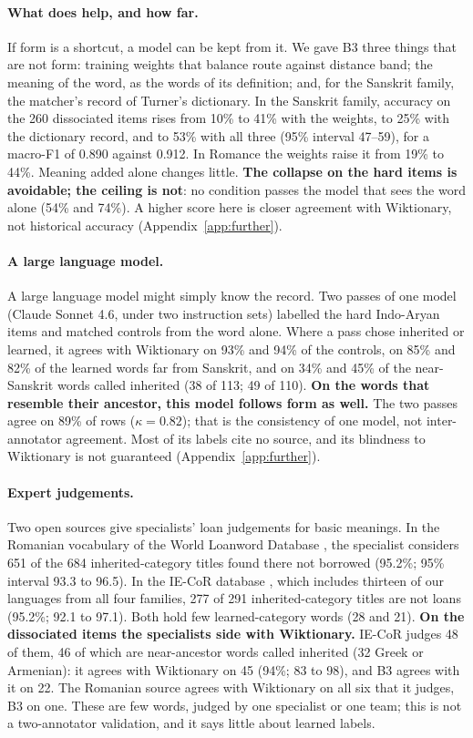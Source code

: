 \documentclass[11pt]{article}
\begin{document}
\paragraph{What does help, and how far.} If form is a shortcut, a model can be kept from it. We gave B3 three things that are not form: training weights that balance route against distance band; the meaning of the word, as the words of its definition; and, for the Sanskrit family, the matcher's record of Turner's dictionary. In the Sanskrit family, accuracy on the 260 dissociated items rises from 10\% to 41\% with the weights, to 25\% with the dictionary record, and to 53\% with all three (95\% interval 47--59), for a macro-F1 of 0.890 against 0.912. In Romance the weights raise it from 19\% to 44\%. Meaning added alone changes little. \textbf{The collapse on the hard items is avoidable; the ceiling is not}: no condition passes the model that sees the word alone (54\% and 74\%). A higher score here is closer agreement with Wiktionary, not historical accuracy (Appendix~\ref{app:further}).

\paragraph{A large language model.} A large language model might simply know the record. Two passes of one model (Claude Sonnet 4.6, under two instruction sets) labelled the hard Indo-Aryan items and matched controls from the word alone. Where a pass chose inherited or learned, it agrees with Wiktionary on 93\% and 94\% of the controls, on 85\% and 82\% of the learned words far from Sanskrit, and on 34\% and 45\% of the near-Sanskrit words called inherited (38 of 113; 49 of 110). \textbf{On the words that resemble their ancestor, this model follows form as well.} The two passes agree on 89\% of rows ($\kappa=0.82$); that is the consistency of one model, not inter-annotator agreement. Most of its labels cite no source, and its blindness to Wiktionary is not guaranteed (Appendix~\ref{app:further}).

\paragraph{Expert judgements.} Two open sources give specialists' loan judgements for basic meanings. In the Romanian vocabulary of the World Loanword Database \citep{schulte2009romanian}, the specialist considers 651 of the 684 inherited-category titles found there not borrowed (95.2\%; 95\% interval 93.3 to 96.5). In the IE-CoR database \citep{heggarty2024iecor}, which includes thirteen of our languages from all four families, 277 of 291 inherited-category titles are not loans (95.2\%; 92.1 to 97.1). Both hold few learned-category words (28 and 21). \textbf{On the dissociated items the specialists side with Wiktionary.} IE-CoR judges 48 of them, 46 of which are near-ancestor words called inherited (32 Greek or Armenian): it agrees with Wiktionary on 45 (94\%; 83 to 98), and B3 agrees with it on 22. The Romanian source agrees with Wiktionary on all six that it judges, B3 on one. These are few words, judged by one specialist or one team; this is not a two-annotator validation, and it says little about learned labels.
\end{document}
